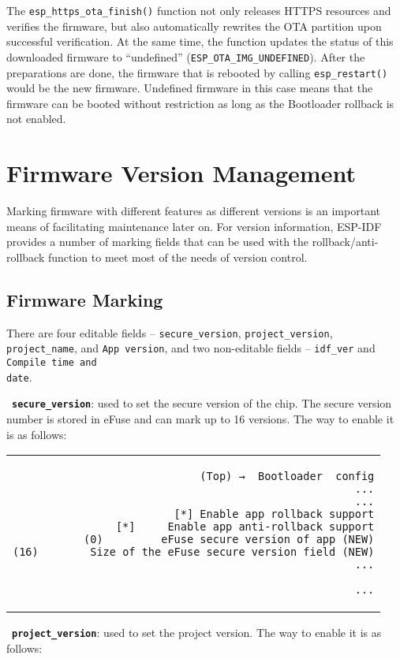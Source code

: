 \documentclass[a4paper,12pt]{book}
\begin{document}
\begin{enumerate}[label=(\arabic*)]
    The \verb|esp_https_ota_finish()| function not only releases HTTPS resources and verifies the firmware, but also automatically rewrites the OTA partition upon successful verification. At the same time, the function updates the status of this downloaded firmware to “undefined” (\verb|ESP_OTA_IMG_UNDEFINED|). After the preparations are done, the firmware that is rebooted by calling \verb|esp_restart()| would be the new firmware. Undefined firmware in this case means that the firmware can be booted without restriction as long as the Bootloader rollback is not enabled.
\end{enumerate}

\section{Firmware Version Management}
Marking firmware with different features as different versions is an important means of facilitating maintenance later on. For version information, ESP-IDF provides a number of marking fields that can be used with the rollback/anti-rollback function to meet most of the needs of version control.

\subsection{Firmware Marking}
There are four editable fields -- \verb|secure_version|, \verb|project_version|, \verb|project_name|, and \verb|App version|, and two non-editable fields -- \verb|idf_ver| and \verb|Compile time and|\\ \verb|date|.

\textbullet\ \textbf{\texttt{secure\_version}}: used to set the secure version of the chip. The secure version number is stored in eFuse and can mark up to 16 versions. The way to enable it is as follows:

\begin{codebloc}
\begin{tabular}{d}
\vspace{2pt}
\begin{verbatim}
(Top) →  Bootloader  config
...
...
[*] Enable app rollback support
[*]     Enable app anti-rollback support
(0)         eFuse secure version of app (NEW)
(16)        Size of the eFuse secure version field (NEW)
...
\end{verbatim}
\verb|...|
\end{tabular}
\end{codebloc}

\textbullet\ \textbf{\texttt{project\_version}}: used to set the project version. The way to enable it is as follows:
\end{document}
